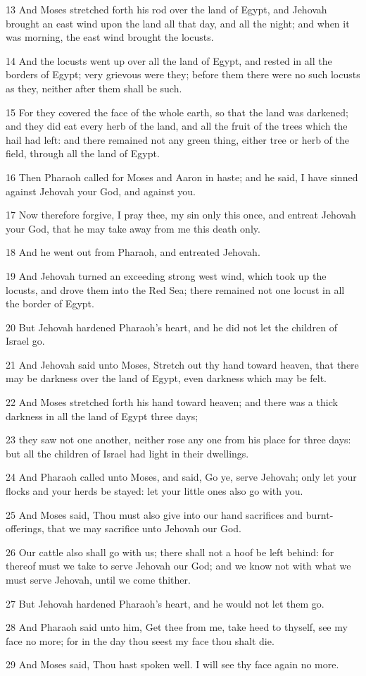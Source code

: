 \par 13 And Moses stretched forth his rod over the land of Egypt, and Jehovah brought an east wind upon the land all that day, and all the night; and when it was morning, the east wind brought the locusts.
\par 14 And the locusts went up over all the land of Egypt, and rested in all the borders of Egypt; very grievous were they; before them there were no such locusts as they, neither after them shall be such.
\par 15 For they covered the face of the whole earth, so that the land was darkened; and they did eat every herb of the land, and all the fruit of the trees which the hail had left: and there remained not any green thing, either tree or herb of the field, through all the land of Egypt.
\par 16 Then Pharaoh called for Moses and Aaron in haste; and he said, I have sinned against Jehovah your God, and against you.
\par 17 Now therefore forgive, I pray thee, my sin only this once, and entreat Jehovah your God, that he may take away from me this death only.
\par 18 And he went out from Pharaoh, and entreated Jehovah.
\par 19 And Jehovah turned an exceeding strong west wind, which took up the locusts, and drove them into the Red Sea; there remained not one locust in all the border of Egypt.
\par 20 But Jehovah hardened Pharaoh's heart, and he did not let the children of Israel go.
\par 21 And Jehovah said unto Moses, Stretch out thy hand toward heaven, that there may be darkness over the land of Egypt, even darkness which may be felt.
\par 22 And Moses stretched forth his hand toward heaven; and there was a thick darkness in all the land of Egypt three days;
\par 23 they saw not one another, neither rose any one from his place for three days: but all the children of Israel had light in their dwellings.
\par 24 And Pharaoh called unto Moses, and said, Go ye, serve Jehovah; only let your flocks and your herds be stayed: let your little ones also go with you.
\par 25 And Moses said, Thou must also give into our hand sacrifices and burnt-offerings, that we may sacrifice unto Jehovah our God.
\par 26 Our cattle also shall go with us; there shall not a hoof be left behind: for thereof must we take to serve Jehovah our God; and we know not with what we must serve Jehovah, until we come thither.
\par 27 But Jehovah hardened Pharaoh's heart, and he would not let them go.
\par 28 And Pharaoh said unto him, Get thee from me, take heed to thyself, see my face no more; for in the day thou seest my face thou shalt die.
\par 29 And Moses said, Thou hast spoken well. I will see thy face again no more.

